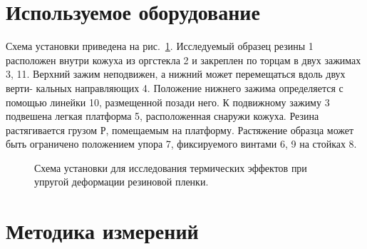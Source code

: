 \documentclass[a4paper,12pt]{article} %
\begin{document}
\section{Используемое оборудование}

Схема установки приведена на рис.~\ref{ris:setup}. Исследуемый образец резины 1 расположен внутри кожуха из оргстекла 2 и закреплен по торцам в двух зажимах 3, 11. Верхний зажим неподвижен, а нижний может перемещаться вдоль двух верти- кальных направляющих 4. Положение нижнего зажима определяется с помощью линейки 10, размещенной позади него. К подвижному зажиму 3 подвешена легкая платформа 5, расположенная снаружи кожуха. Резина растягивается грузом Р, помещаемым на платформу. Растяжение образца может быть ограничено положением упора 7, фиксируемого винтами 6, 9 на стойках 8.	
\begin{figure}[H]
    \caption{Схема установки для исследования термических эффектов при упругой деформации резиновой пленки.}
    \label{ris:setup}
\end{figure}

\section{Методика измерений}
\end{document}
